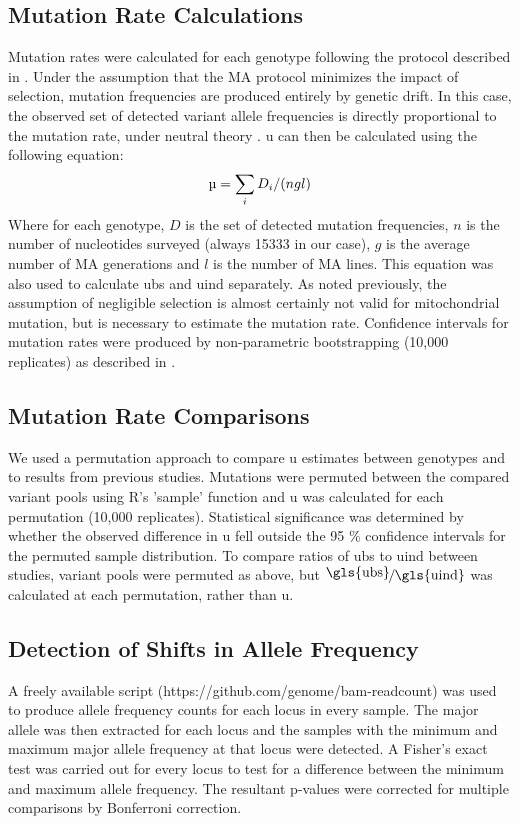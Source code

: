 \documentclass[12pt,twoside]{reedthesis}
\begin{document}
\subsection{Mutation Rate Calculations}
Mutation rates were calculated for each genotype following the protocol described in \cite{haag-liautard_direct_2008}.
Under the assumption that the \gls{MA} protocol minimizes the impact of selection, mutation frequencies are produced entirely by genetic drift. 
In this case, the observed set of detected variant allele frequencies is directly proportional to the mutation rate, under neutral theory \citep{kimura_neutral_1983}. 
\gls{u} can then be calculated using the following equation:
\[\textrm{\textmu} = \sum_{i}D_{i}/(ngl)\]
Where for each genotype, $D$ is the set of detected mutation frequencies, $n$ is the number of nucleotides surveyed (always 15333 in our case), $g$ is the average number of \gls{MA} generations and $l$ is the number of \gls{MA} lines.
This equation was also used to calculate \gls{ubs} and \gls{uind} separately.
As noted previously, the assumption of negligible selection is almost certainly not valid for mitochondrial mutation, but is necessary to estimate the mutation rate. 
Confidence intervals for mutation rates were produced by non-parametric bootstrapping (10,000 replicates) as described in \cite{xu_high_2012}.

\subsection{Mutation Rate Comparisons}
We used a permutation approach to compare \gls{u} estimates between genotypes and to results from previous studies.
Mutations were permuted between the compared variant pools using R's 'sample' function and \gls{u} was calculated for each permutation (10,000 replicates).
Statistical significance was determined by whether the observed difference in \gls{u} fell outside the 95 \% confidence intervals for the permuted sample distribution.
To compare ratios of \gls{ubs} to \gls{uind} between studies, variant pools were permuted as above, but $\nicefrac{\text{\normalsize\gls{ubs}}}{\text{\normalsize\gls{uind}}}$ was calculated at each permutation, rather than \gls{u}. 

\subsection{Detection of Shifts in Allele Frequency}
A freely available script (https://github.com/genome/bam-readcount) was used to produce allele frequency counts for each locus in every sample.
The major allele was then extracted for each locus and the samples with the minimum and maximum major allele frequency at that locus were detected.
A Fisher's exact test was carried out for every locus to test for a difference between the minimum and maximum allele frequency.
The resultant p-values were corrected for multiple comparisons by Bonferroni correction.
\end{document}
